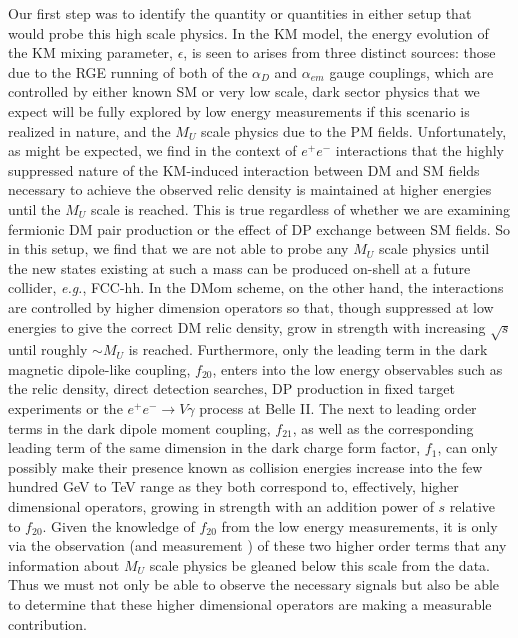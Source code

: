 \documentclass[14pt]{article}
\def\eg{{\it e.g.}}
\def\to{\rightarrow}
\begin{document}
{Our first step was to identify the quantity or quantities in either setup that would probe this high scale physics. In the KM model, the energy evolution of the KM mixing parameter, $\epsilon$, is seen to 
arises from three distinct sources: those due to the RGE running of both of the $\alpha_D$ and $\alpha_{em}$ gauge couplings, which are controlled by either known SM or very low scale, dark 
sector physics that we expect will be fully explored by low energy measurements if 
this scenario is realized in nature, and the $M_U$ scale physics due to the PM fields. Unfortunately, as might be expected, we find in the context of $e^+e^-$ interactions that the highly suppressed 
nature of the KM-induced interaction between DM and SM fields necessary to achieve the observed relic density is maintained at higher energies until the $M_U$ scale is reached. This is true regardless 
of whether we are examining fermionic DM pair production or the effect of DP exchange between SM fields. So in this setup, we find that we are not able to probe any $M_U$ scale physics until the 
new states existing at such a mass can be produced on-shell at a future collider, \eg, FCC-hh. In the DMom scheme, on the other hand, the interactions are controlled by higher dimension operators 
so that, though suppressed at low energies to give the correct DM relic density, grow in strength with increasing $\sqrt s$ until roughly $\sim M_U$ is reached. Furthermore, only the leading term in the 
dark magnetic dipole-like coupling, $f_{20}$, enters into the low energy observables such as the relic density, direct detection searches, DP production in fixed target experiments or the 
$e^+e^-\to V\gamma$ process at Belle II. The next to leading order terms in the dark dipole moment coupling, $f_{21}$, as well as the corresponding leading term of the same dimension in the dark 
charge form factor, $f_1$, can only possibly make their presence known as collision energies increase into the few hundred GeV to TeV range as they both correspond to, effectively, higher dimensional 
operators, growing in strength with an addition power of $s$ relative to $f_{20}$. Given the knowledge of $f_{20}$ from the low energy measurements, it is only via the observation (and measurement ) 
of these two higher order terms that any information about $M_U$ scale physics be gleaned below this scale from the data. Thus we must not only be able to observe the necessary signals but also be 
able to determine that these higher dimensional operators are making a measurable contribution.

}
\end{document}
